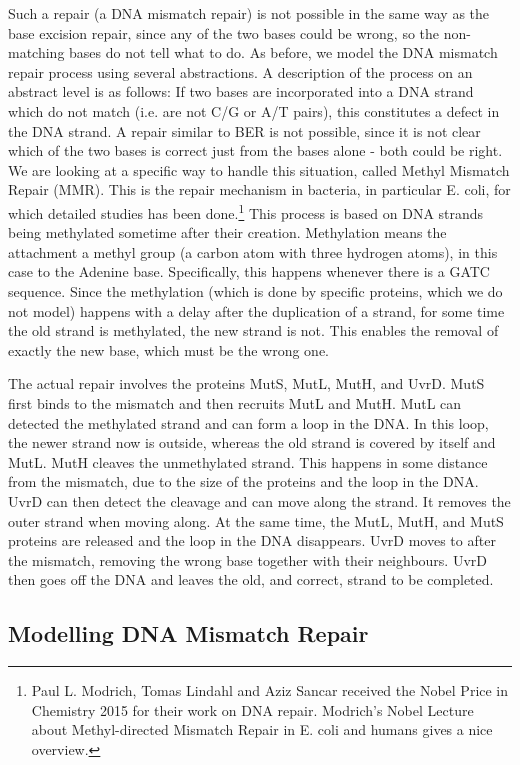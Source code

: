 \documentclass[review]{elsarticle}
\begin{document}
Such a repair (a DNA mismatch repair) is not possible in the same way as the base excision repair, since any of the two bases could be wrong, so the non-matching  bases do not tell what to do. As before, we model the DNA mismatch repair process using several abstractions. A description of the process on an abstract level is as follows: If two bases are incorporated into a DNA strand which do not match (i.e. are not C/G or A/T pairs), this constitutes a defect in the DNA strand. A repair similar to BER is not possible, since it is not clear which of the two bases is correct just from the bases alone - both could be right. We are looking at a specific way to handle this situation, called Methyl Mismatch Repair (MMR). This is the repair mechanism in bacteria, in particular E. coli, for which detailed studies has been done.\footnote{Paul L. Modrich, Tomas Lindahl and Aziz Sancar received the Nobel Price in Chemistry 2015 for their work on DNA repair. Modrich's Nobel Lecture about Methyl-directed Mismatch Repair in E. coli and humans \cite{pmid27198632} gives a nice overview.} This process is based on DNA strands being methylated sometime after their creation. Methylation means the attachment a methyl group (a carbon atom with three hydrogen atoms), in this case to the Adenine base. Specifically, this happens whenever there is a GATC sequence. Since the methylation (which is done by specific proteins, which we do not model) happens with a delay after the duplication of a strand, for some time the old strand is methylated, the new strand is not. This enables the removal of exactly the new base, which must be the wrong one.

The actual repair involves the proteins MutS, MutL, MutH, and UvrD. MutS first binds to the mismatch and then recruits MutL and MutH. MutL can detected the methylated strand and can form a loop in the DNA. In this loop, the newer strand now is outside, whereas the old strand is covered by itself and MutL. MutH cleaves the unmethylated strand. This happens in some distance from the mismatch, due to the size of the proteins and the loop in the DNA. UvrD can then detect the cleavage and can move along the strand. It removes the outer strand when moving along. At the same time, the MutL, MutH, and MutS proteins are released and the loop in the DNA disappears. UvrD moves to after the mismatch, removing the wrong base together with their neighbours. UvrD then goes off the DNA and leaves the old, and correct, strand to be completed. 

\subsection{Modelling DNA Mismatch Repair}
\end{document}
